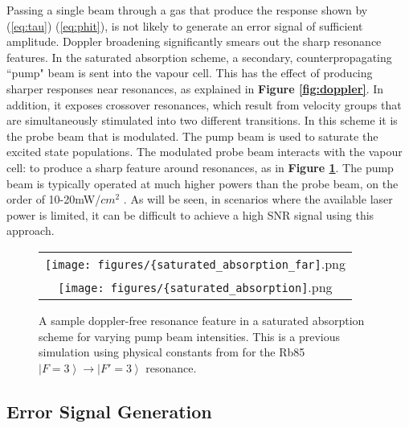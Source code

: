 Passing a single beam through a gas that produce the response shown by (\ref{eq:tau}) (\ref{eq:phit}), is not likely to generate an error signal of sufficient amplitude. Doppler broadening significantly smears out the sharp resonance features. In the saturated absorption scheme, a secondary, counterpropagating ``pump" beam is sent into the vapour cell. This has the effect of producing sharper responses near resonances, as explained in \textbf{Figure \ref{fig:doppler}}. In addition, it exposes crossover resonances, which result from velocity groups that are simultaneously stimulated into two different transitions. In this scheme it is the probe beam that is modulated. The pump beam is used to saturate the excited state populations. The modulated probe beam interacts with the vapour cell:
to produce a sharp feature around resonances, as in \textbf{Figure \ref{fig:sat_abs}}. The pump beam is typically operated at much higher powers than the probe beam, on the order of 10-20mW/$cm^2$ \cite{maguire2006}. As will be seen, in scenarios where the available laser power is limited, it can be difficult to achieve a high SNR signal using this approach.

\begin{figure}
  \centering
  \begin{tabular}{c}
    \texttt{[image: figures/\{saturated\_absorption\_far]}.png}\\
    \texttt{[image: figures/\{saturated\_absorption]}.png}
  \end{tabular}
  \caption{A sample doppler-free resonance feature in a saturated absorption scheme for varying pump beam intensities. This is a previous simulation using physical constants from \cite{steckrb85} for the Rb85 $\left|F=3\right\rangle \rightarrow \left|F'=3\right\rangle$ resonance.}
  \label{fig:sat_abs}
\end{figure}



\subsection{Error Signal Generation}


